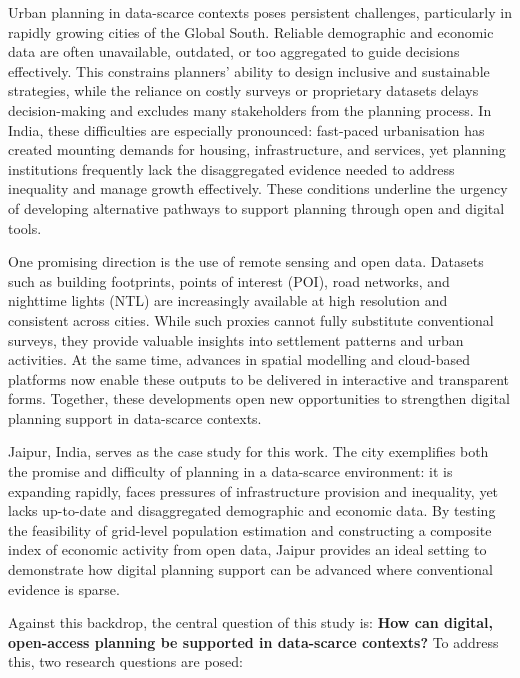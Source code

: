 \documentclass[
  12pt,
  oneside]{book}
\begin{document}

Urban planning in data-scarce contexts poses persistent challenges, particularly in rapidly growing cities of the Global South. Reliable demographic and economic data are often unavailable, outdated, or too aggregated to guide decisions effectively. This constrains planners' ability to design inclusive and sustainable strategies, while the reliance on costly surveys or proprietary datasets delays decision-making and excludes many stakeholders from the planning process. In India, these difficulties are especially pronounced: fast-paced urbanisation has created mounting demands for housing, infrastructure, and services, yet planning institutions frequently lack the disaggregated evidence needed to address inequality and manage growth effectively. These conditions underline the urgency of developing alternative pathways to support planning through open and digital tools.

One promising direction is the use of remote sensing and open data. Datasets such as building footprints, points of interest (POI), road networks, and nighttime lights (NTL) are increasingly available at high resolution and consistent across cities. While such proxies cannot fully substitute conventional surveys, they provide valuable insights into settlement patterns and urban activities. At the same time, advances in spatial modelling and cloud-based platforms now enable these outputs to be delivered in interactive and transparent forms. Together, these developments open new opportunities to strengthen digital planning support in data-scarce contexts.

Jaipur, India, serves as the case study for this work. The city exemplifies both the promise and difficulty of planning in a data-scarce environment: it is expanding rapidly, faces pressures of infrastructure provision and inequality, yet lacks up-to-date and disaggregated demographic and economic data. By testing the feasibility of grid-level population estimation and constructing a composite index of economic activity from open data, Jaipur provides an ideal setting to demonstrate how digital planning support can be advanced where conventional evidence is sparse.

Against this backdrop, the central question of this study is: \textbf{How can digital, open-access planning be supported in data-scarce contexts?} To address this, two research questions are posed:
\end{document}
